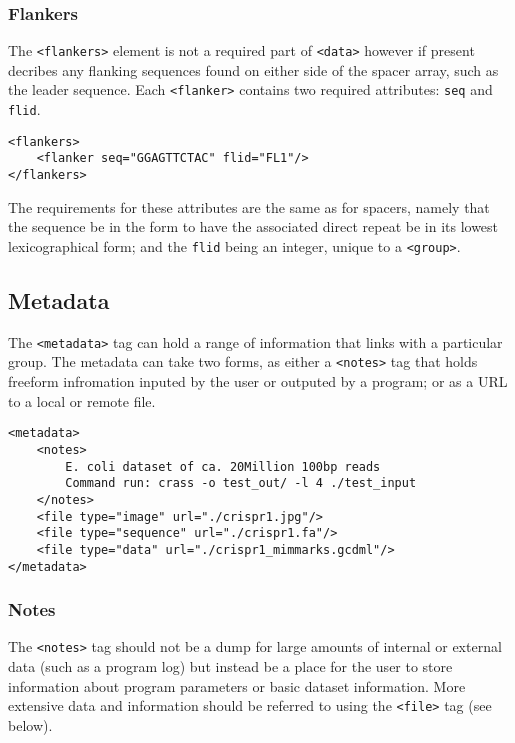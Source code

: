 \documentclass[11pt]{article} %
\begin{document}
\subsubsection{Flankers}
The \lstinline[language=XML_new]$<flankers>$ element is not a required part of \lstinline[language=XML_new]$<data>$ however if present decribes any flanking sequences found on either side of the spacer array, such as the leader sequence. Each \lstinline[language=XML_new]$<flanker>$ contains two required attributes: \lstinline[language=XML_new]$seq$ and \lstinline[language=XML_new]$flid$.
\begin{lstlisting}[language=XML_new]
<flankers>
	<flanker seq="GGAGTTCTAC" flid="FL1"/>
</flankers>
\end{lstlisting}
The requirements for these attributes are the same as for spacers, namely that the sequence be in the form to have the associated direct repeat be in its lowest lexicographical form; and the \lstinline[language=XML_new]$flid$ being an integer, unique to a \lstinline[language=XML_new]$<group>$.
\subsection{Metadata}
The \lstinline[language=XML_new]$<metadata>$ tag can hold a range of information that links with a particular group.  The metadata can take two forms, as either a \lstinline[language=XML_new]$<notes>$ tag that holds freeform infromation inputed by the user or outputed by a program; or as a URL to a local or remote file.
\begin{lstlisting}[language=XML_new]
<metadata>
	<notes>
		E. coli dataset of ca. 20Million 100bp reads
		Command run: crass -o test_out/ -l 4 ./test_input
	</notes>
	<file type="image" url="./crispr1.jpg"/>
	<file type="sequence" url="./crispr1.fa"/>
	<file type="data" url="./crispr1_mimmarks.gcdml"/>
</metadata>
\end{lstlisting}

\subsubsection{Notes}
The \lstinline[language=XML_new]$<notes>$ tag should not be a dump for large amounts of internal or external data (such as a program log) but instead be a place for the user to store information about program parameters or basic dataset information.  More extensive data and information should be referred to using the \lstinline[language=XML_new]$<file>$ tag (see below).
\end{document}
